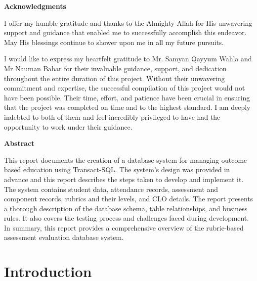 \documentclass[12pt,a4paper]{article}
\begin{document}
\newpage
\begin{center}
\textbf{\LARGE {Acknowledgments}}\\
\end{center}
\justifying
I offer my humble gratitude and thanks to the Almighty Allah for His unwavering support and guidance that enabled me to successfully accomplish this endeavor. May His blessings continue to shower upon me in all my future pursuits.

I would like to express my heartfelt gratitude to Mr. Samyan Qayyum Wahla and Mr Nauman Babar for their invaluable guidance, support, and dedication throughout the entire duration of this project. Without their unwavering commitment and expertise, the successful compilation of this project would not have been possible. Their time, effort, and patience have been crucial in ensuring that the project was completed on time and to the highest standard. I am deeply indebted to both of them and feel incredibly privileged to have had the opportunity to work under their guidance.
\newpage

\tableofcontents
\thispagestyle{empty}

\newpage




\thispagestyle{empty}
\listoffigures


\newpage
\setcounter{page}{1}
\begin{center}
\textbf{\LARGE {Abstract}}\\
\end{center}
\justifying
This report documents the creation of a database system for managing outcome based education using Transact-SQL. The system's design was provided in advance and this report describes the steps taken to develop and implement it. The system contains student data, attendance records, assessment and component records, rubrics and their levels, and CLO details. The report presents a thorough description of the database schema, table relationships, and business rules. It also covers the testing process and challenges faced during development. In summary, this report provides a comprehensive overview of the rubric-based assessment evaluation database system.
\newpage
\justifying
\section{Introduction}
\end{document}
